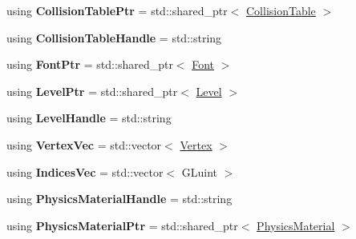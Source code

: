 \begin{DoxyCompactItemize}
\item 
\hypertarget{namespaceDCEngine_a02782c70cca59817f21b4f4597519db6}{using {\bfseries Collision\-Table\-Ptr} = std\-::shared\-\_\-ptr$<$ \hyperlink{classDCEngine_1_1CollisionTable}{Collision\-Table} $>$}\label{namespaceDCEngine_a02782c70cca59817f21b4f4597519db6}

\item 
\hypertarget{namespaceDCEngine_aef29afa34cb406bd9d7e212bb1a5f361}{using {\bfseries Collision\-Table\-Handle} = std\-::string}\label{namespaceDCEngine_aef29afa34cb406bd9d7e212bb1a5f361}

\item 
\hypertarget{namespaceDCEngine_aaa5af82525fcd7a4ffad07078fefa6b8}{using {\bfseries Font\-Ptr} = std\-::shared\-\_\-ptr$<$ \hyperlink{classDCEngine_1_1Font}{Font} $>$}\label{namespaceDCEngine_aaa5af82525fcd7a4ffad07078fefa6b8}

\item 
\hypertarget{namespaceDCEngine_ac0662137e1800c2aa8dca31c0d329de7}{using {\bfseries Level\-Ptr} = std\-::shared\-\_\-ptr$<$ \hyperlink{classDCEngine_1_1Level}{Level} $>$}\label{namespaceDCEngine_ac0662137e1800c2aa8dca31c0d329de7}

\item 
\hypertarget{namespaceDCEngine_a3bab6c6472ec812d64ec61e7662fbcff}{using {\bfseries Level\-Handle} = std\-::string}\label{namespaceDCEngine_a3bab6c6472ec812d64ec61e7662fbcff}

\item 
\hypertarget{namespaceDCEngine_ab5c296a2a9d5e12eea9c50051adeddf1}{using {\bfseries Vertex\-Vec} = std\-::vector$<$ \hyperlink{structDCEngine_1_1Vertex}{Vertex} $>$}\label{namespaceDCEngine_ab5c296a2a9d5e12eea9c50051adeddf1}

\item 
\hypertarget{namespaceDCEngine_a8901fd21b8775ddf6f41e90109786574}{using {\bfseries Indices\-Vec} = std\-::vector$<$ G\-Luint $>$}\label{namespaceDCEngine_a8901fd21b8775ddf6f41e90109786574}

\item 
\hypertarget{namespaceDCEngine_ae403ab188814569d0880c6f9d4ef32c4}{using {\bfseries Physics\-Material\-Handle} = std\-::string}\label{namespaceDCEngine_ae403ab188814569d0880c6f9d4ef32c4}

\item 
\hypertarget{namespaceDCEngine_a7b46e51e8a42771f646fb7ac87525485}{using {\bfseries Physics\-Material\-Ptr} = std\-::shared\-\_\-ptr$<$ \hyperlink{classDCEngine_1_1PhysicsMaterial}{Physics\-Material} $>$}\label{namespaceDCEngine_a7b46e51e8a42771f646fb7ac87525485}


\end{DoxyCompactItemize}
